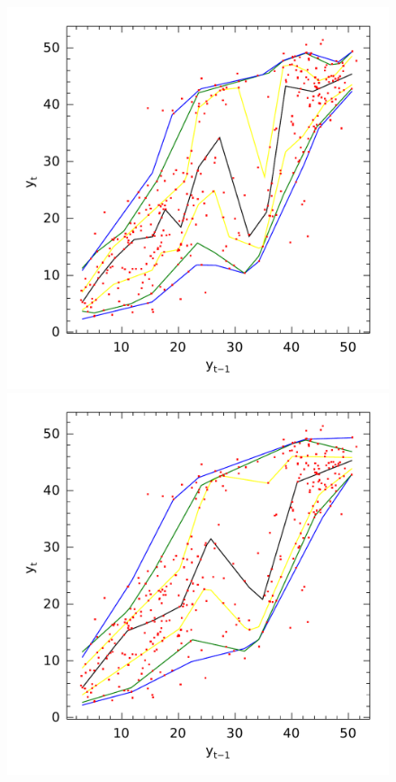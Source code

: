 \begin{figure}[htp]
\begin{minipage}[t]{0.4\linewidth}
\begin{minipage}[b]{\linewidth}
    \end{minipage}
     \begin{minipage}[b]{\linewidth}
      \centering     \includegraphics[width=\textwidth]{Figuras/npqar/icaraizinho-crossing-1}
     \end{minipage}
  \end{minipage}
  \begin{minipage}[t]{0.4\linewidth}
    \centering
    \begin{minipage}[t]{\linewidth}
      \centering     \includegraphics[width=\textwidth]{Figuras/npqar/icaraizinho-crossing-3}

\end{minipage}
\end{minipage}
\end{figure}
